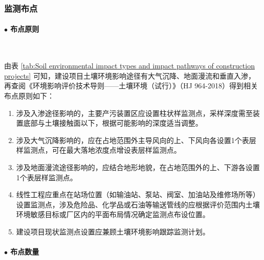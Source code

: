 \subsubsection{监测布点}

\paragraph{$\bullet $ 布点原则}~{}\par

由表 \ref{tab:Soil environmental impact types and impact pathways of construction projects} 可知，建设项目土壤环境影响途径有大气沉降、地面漫流和垂直入渗，再查阅《环境影响评价技术导则——土壤环境（试行）》（HJ 964-2018）得到相关布点原则如下：
\begin{enumerate}
    \item 涉及入渗途径影响的，主要产污装置区应设置柱状样监测点，采样深度需至装置底部与土壤接触面以下，根据可能影响的深度适当调整。
    \item 涉及大气沉降影响的，应在占地范围外主导风向的上、下风向各设置1个表层样监测点，可在最大落地浓度点增设表层样监测点。
    \item 涉及地面漫流途径影响的，应结合地形地貌，在占地范围外的上、下游各设置1个表层样监测点。
    \item 线性工程应重点在站场位置（如输油站、泵站、阀室、加油站及维修场所等）设置监测点，涉及危险品、化学品或石油等输送管线的应根据评价范围内土壤环境敏感目标或厂区内的平面布局情况确定监测点布设位置。
    \item 建设项目现状监测点设置应兼顾土壤环境影响跟踪监测计划。
\end{enumerate}


\paragraph{$\bullet $ 布点数量}~{}\par


